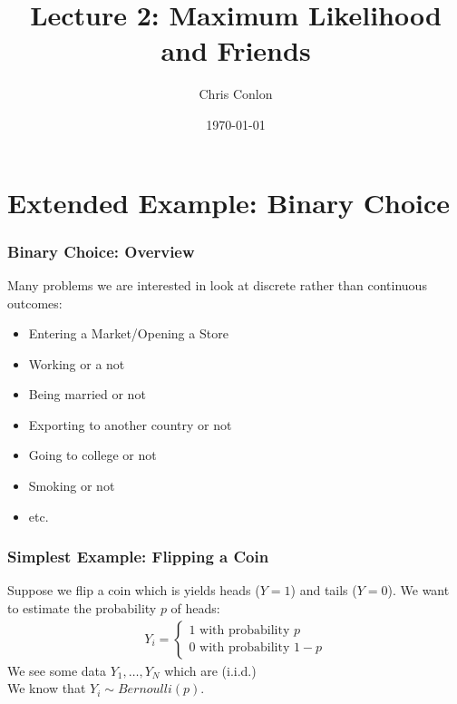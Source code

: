 




\title{Lecture 2: Maximum Likelihood and Friends}
\author{Chris Conlon }

\newcommand{\fp}{\frame[plain]}

\date{\today}


\maketitle

\section{Extended Example: Binary Choice}
\begin{frame}
\frametitle{Binary Choice: Overview}
Many problems we are interested in look at discrete rather than continuous outcomes:
\begin{itemize}
\item Entering a Market/Opening a Store
\item Working or a not
\item Being married or not
\item Exporting to another country or not
\item Going to college or not
\item Smoking or not
\item etc.
\end{itemize}
\end{frame}

\begin{frame}
\frametitle{Simplest Example: Flipping a Coin}
Suppose we flip a coin which is yields heads ($Y=1$) and tails ($Y=0$). We want to estimate the probability $p$ of heads:
\begin{eqnarray*}
Y_i =
\begin{cases}
1 \mbox{ with probability } p \\
0 \mbox{ with probability } 1-p
\end{cases}
\end{eqnarray*}
We see some data $Y_1,\ldots,Y_N$ which are (i.i.d.)\\
\vspace{0.2cm}
We know that $Y_i \sim Bernoulli(p)$.
\end{frame}


